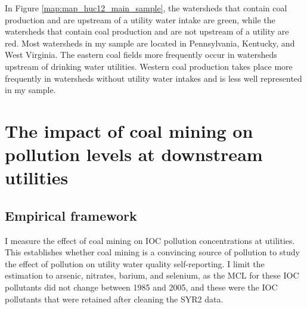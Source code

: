 \documentclass[12pt]{article}
\begin{document}
In Figure \ref{map:map_huc12_main_sample}, the watersheds that contain coal production and are upstream of a utility water intake are green, while the watersheds that contain coal production and are not upstream of a utility are red. Most watersheds in my sample are located in Pennsylvania, Kentucky, and West Virginia. The eastern coal fields more frequently occur in watersheds upstream of drinking water utilities. Western coal production takes place more frequently in watersheds without utility water intakes and is less well represented in my sample.



\section{The impact of coal mining on pollution levels at downstream utilities}\label{sec:concentration}

\subsection{Empirical framework}

I measure the effect of coal mining on IOC pollution concentrations at utilities. This establishes whether coal mining is a convincing source of pollution to study the effect of pollution on utility water quality self-reporting. I limit the estimation to arsenic, nitrates, barium, and selenium, as the MCL for these IOC pollutants did not change between 1985 and 2005, and these were the IOC pollutants that were retained after cleaning the SYR2 data.
\end{document}
